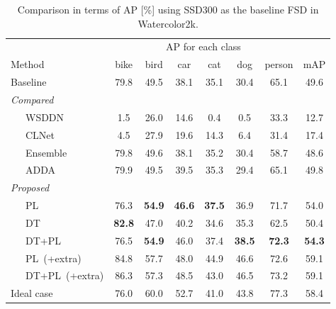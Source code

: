 \documentclass[10pt,twocolumn,letterpaper]{article}
\newcommand{\datasetwatercolor}{Watercolor2k}
\newcommand{\lvl}{~~~}
\begin{document}
\begin{table}[t]
    \caption{Comparison in terms of AP [\%] using SSD300 as the baseline FSD in \datasetwatercolor.}
    \label{tbl:ap_on_each_class_bam_watercolor}
        \tabcolsep=1.5pt
        \centering
        \begin{tabular}{@{}lccccccc@{}}\toprule
        	& \multicolumn{6}{c}{AP for each class} & \\ \cmidrule(r){2-7}
            Method & bike & bird & car & cat & dog & person & mAP \\ \midrule
            Baseline & 79.8 & 49.5 & 38.1 & 35.1 & 30.4 & 65.1 & 49.6 \\ \midrule
            \textit{Compared} & & & & & & & \\
            \lvl WSDDN~\cite{bilen2016weakly} & 1.5 & 26.0 & 14.6 & 0.4 & 0.5 & 33.3 & 12.7 \\
            \lvl CLNet~\cite{kantorov2016contextlocnet} & 4.5 & 27.9 & 19.6 & 14.3 & 6.4 & 31.4 & 17.4 \\
            \lvl Ensemble & 79.8 & 49.6 & 38.1 & 35.2 & 30.4 & 58.7 & 48.6\\
            \lvl ADDA~\cite{tzeng2017adversarial} & 79.9 & 49.5 & 39.5 & 35.3 & 29.4 & 65.1 & 49.8 \\ \midrule
            \textit{Proposed} & & & & & & & \\
            \lvl PL & 76.3 & \textbf{54.9} & \textbf{46.6} & \textbf{37.5} & 36.9 & 71.7 & 54.0 \\
            \lvl DT & \textbf{82.8} & 47.0 & 40.2 & 34.6 & 35.3 & 62.5 & 50.4 \\
            \lvl DT+PL & 76.5 & \textbf{54.9} & 46.0 & 37.4 & \textbf{38.5} & \textbf{72.3} & \textbf{54.3}\\ \midrule
            \lvl PL~(+extra) & 84.8 & 57.7 & 48.0 & 44.9 & 46.6 & 72.6 & 59.1\\
            \lvl DT+PL~(+extra) & 86.3 & 57.3 & 48.5 & 43.0 & 46.5 & 73.2 & 59.1\\ \midrule
            Ideal case & 76.0 & 60.0 & 52.7 & 41.0 & 43.8 & 77.3 & 58.4 \\ \bottomrule
        \end{tabular}
\end{table}
\end{document}
